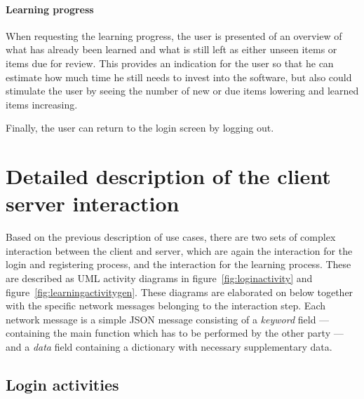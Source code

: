 \paragraph{Learning progress} When requesting the learning progress, the user is presented of an overview of what has already been learned and what is still left as either unseen items or items due for review. This provides an indication for the user so that he can estimate how much time he still needs to invest into the software, but also could stimulate the user by seeing the number of new or due items lowering and learned items increasing.

Finally, the user can return to the login screen by logging out.

\section{Detailed description of the client server interaction}

Based on the previous description of use cases, there are two sets of complex interaction between the client and server, which are again the interaction for the login and registering process, and the interaction for the learning process. These are described as UML activity diagrams \cite{uml} in figure~\ref{fig:loginactivity} and figure~\ref{fig:learningactivitygen}. These diagrams are elaborated on below together with the specific network messages belonging to the interaction step. Each network message is a simple JSON message consisting of a \emph{keyword} field --- containing the main function which has to be performed by the other party --- and a \emph{data} field containing a dictionary with necessary supplementary data.

\subsection{Login activities}

